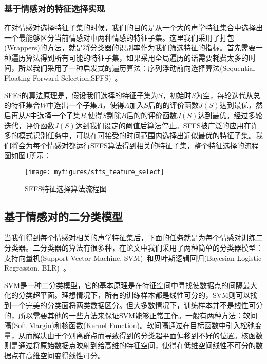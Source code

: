 \subsubsection{基于情感对的特征选择实现}
\label{sssec:emo_pair_feature_select_implement}
在对情感对选择特征子集的时候，我们的目的是从一个大的声学特征集合中选择出一个最能够区分当前情感对中两种情感的特征子集。这里我们采用了打包(Wrappers)的方法，就是将分类器的识别率作为我们筛选特征的指标。首先需要一种遍历算法得到所有可能的特征子集，如果采用全局遍历的话需要耗费太多的时间，所以我们采用了一种启发式的遍历算法：序列浮动前向选择算法(Sequential Floating Forward Selection,SFFS)~\cite{Ververidis2008Fast}。

SFFS的算法原理是，假设我们选择的特征子集为$S$，初始时$S$为空，每轮迭代从总的特征集合$W$中选出一个子集$A$，使得$A$加入$S$后的的评价函数$J(S)$达到最优，然后再从$S$中选择一个子集$B$,使得$S$剔除$B$后的的评价函数$J(S)$达到最优。经过多轮迭代，评价函数$J(S)$达到我们设定的阈值后算法停止。SFFS被广泛的应用在许多的模式识别任务中，可以在可接受的时间范围内选择出近似最优的特征子集。我们将会为每个情感对都运行SFFS算法得到相关的特征子集，整个特征选择的流程图如图\ref{fig:sffs_feature_select}所示：

\begin{figure}[H] %
    \centering
    \texttt{[image: myfigures/sffs\_feature\_select]}
    \caption{SFFS特征选择算法流程图}
    \label{fig:sffs_feature_select}
\end{figure}

\subsection{基于情感对的二分类模型}
\label{ssec:emo_pair_bi_cls}

当我们得到每个情感对相关的声学特征集后，下面的任务就是为每个情感对训练二分类器。二分类器的算法有很多种，在论文中我们采用了两种简单的分类器模型：支持向量机(Support Vector Machine, SVM)~\cite{Burges2008A}和贝叶斯逻辑回归(Bayesian Logistic Regression, BLR)~\cite{Genkin2007Large}。

SVM是一种二分类模型，它的基本原理是在特征空间中寻找使数据点的间隔最大化的分类超平面。理想情况下，所有的训练样本都是线性可分的，SVM则可以找到一个完美的分类面将两类数据区分。但大多数情况下，训练样本并不是线性可分的，所以需要其他的一些方法来保证SVM能够正常工作。一般有两种方法：软间隔(Soft Margin)和核函数(Kernel Function)。软间隔通过在目标函数中引入松弛变量，从而解决由于个别离群点而导致得到的分类超平面偏移到不好的位置。核函数则是通过将原始数据点映射到给高维的特征空间，使得在低维空间线性不可分的数据点在高维空间变得线性可分。

